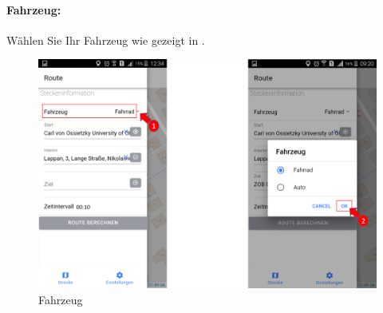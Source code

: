 \paragraph{Fahrzeug:}
Wählen Sie Ihr Fahrzeug wie gezeigt in .
\begin{figure}[h!]
\centerline{\includegraphics[height=6 cm]{./ressourcen/nutzerhandbuch/Fahrzeug.png}}
\caption{Fahrzeug}
\label{fig:app:Fahrzeug}
\end{figure} 


